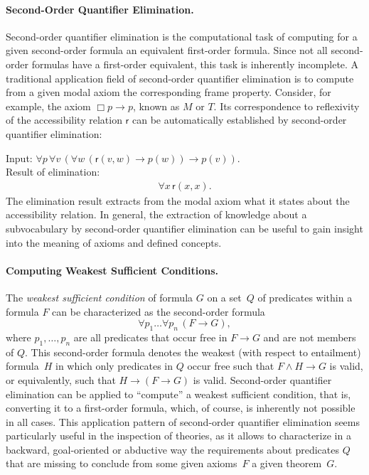 \documentclass[a4paper]{article}
\newcommand{\f}[1]{\mathsf{#1}}
\newcommand{\imp}{\rightarrow}
\newcounter{def}
\begin{document}
  \paragraph{Second-Order Quantifier Elimination.}

  Second-order quantifier elimination \cite{soqe:book} is the computational
  task of computing for a given second-order formula an equivalent first-order
  formula. Since not all second-order formulas have a first-order equivalent,
  this task is inherently incomplete.  A traditional application field of
  second-order quantifier elimination is to compute from a given modal axiom
  the corresponding frame property. Consider, for example, the axiom $\Box p
  \imp p$, known as $M$ or $T$. Its correspondence to reflexivity of the
  accessibility relation $\f{r}$ can be automatically established by
  second-order quantifier elimination:

  \smallskip
  

\noindent Input: $\forall \mathit{p} \, \forall \mathit{v} \, (\forall \mathit{w} \, (\mathsf{r}(\mathit{v},\mathit{w}) \imp  \mathit{p}(\mathit{w})) \imp  \mathit{p}(\mathit{v})).$\\
\noindent Result of elimination:
\[\begin{array}{lllll}
\forall \mathit{x} \, \mathsf{r}(\mathit{x},\mathit{x}).
\end{array}
\]
%
%
  \noindent The elimination result extracts from the modal axiom what it
  states about the accessibility relation.  In general, the extraction of
  knowledge about a subvocabulary by second-order quantifier elimination can
  be useful to gain insight into the meaning of axioms and defined concepts.

  \paragraph{Computing Weakest Sufficient Conditions.}
  \label{sec-wsc-informal}
  
  The \emph{weakest sufficient condition}
  \cite{lin:snc,dls:snc,cw:2012:projcirc} of formula $G$ on a set~$Q$ of
  predicates within a formula $F$ can be characterized as the second-order
  formula \[\forall p_1 \ldots \forall p_n\, (F \imp G),\] where $p_1, \ldots,
  p_n$ are all predicates that occur free in $F \imp G$ and are not members of
  $Q$.  This second-order formula denotes the weakest (with respect to
  entailment) formula~$H$ in which only predicates in $Q$ occur free such that
  $F \land H \imp G$ is valid, or equivalently, such that $H \imp (F \imp G)$
  is valid.  Second-order quantifier elimination can be applied to ``compute''
  a weakest sufficient condition, that is, converting it to a first-order
  formula, which, of course, is inherently not possible in all cases.  This
  application pattern of second-order quantifier elimination seems
  particularly useful in the inspection of theories, as it allows to
  characterize in a backward, goal-oriented or abductive way the requirements
  about predicates $Q$ that are missing to conclude from some given axioms~$F$
  a given theorem~$G$.
  
\end{document}
